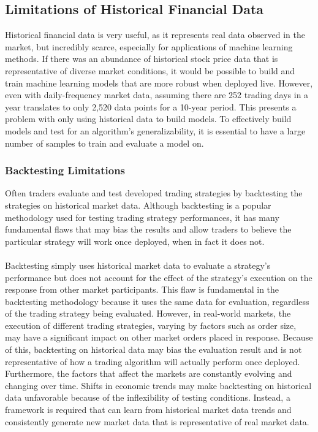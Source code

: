 \subsection{Limitations of Historical Financial Data}
Historical financial data is very useful, as it represents real data observed in the market, but incredibly scarce, especially for applications of machine learning methods. If there was an abundance of historical stock price data that is representative of diverse market conditions, it would be possible to build and train machine learning models that are more robust when deployed live. However, even with daily-frequency market data, assuming there are 252 trading days in a year translates to only 2,520 data points for a 10-year period. This presents a problem with only using historical data to build models. To effectively build models and test for an algorithm's generalizability, it is essential to have a large number of samples to train and evaluate a model on.

\subsubsection{Backtesting Limitations}
Often traders evaluate and test developed trading strategies by backtesting the strategies on historical market data. Although backtesting is a popular methodology used for testing trading strategy performances, it has many fundamental flaws that may bias the results and allow traders to believe the particular strategy will work once deployed, when in fact it does not.
\\
\\
Backtesting simply uses historical market data to evaluate a strategy's performance but does not account for the effect of the strategy's execution on the response from other market participants. This flaw is fundamental in the backtesting methodology because it uses the same data for evaluation, regardless of the trading strategy being evaluated. However, in real-world markets, the execution of different trading strategies, varying by factors such as order size, may have a significant impact on other market orders placed in response. Because of this, backtesting on historical data may bias the evaluation result and is not representative of how a trading algorithm will actually perform once deployed. Furthermore, the factors that affect the markets are constantly evolving and changing over time. Shifts in economic trends may make backtesting on historical data unfavorable because of the inflexibility of testing conditions. Instead, a framework is required that can learn from historical market data trends and consistently generate new market data that is representative of real market data.

